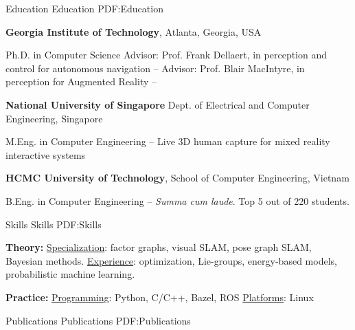 \documentclass[letterpaper,MMMyyyy,nonstopmode]{simpleresumecv}
\begin{document}
\begin{Body}

\Section
{Education}
{Education}
{PDF:Education}

\Entry
{\textbf{Georgia Institute of Technology}},
Atlanta, Georgia, USA

\Gap
\BulletItem
Ph.D. in Computer Science
\SubBulletItem
Advisor: Prof. Frank Dellaert, in perception and control for autonomous navigation
\hfill
{} -- 
\SubBulletItem
Advisor: Prof. Blair MacIntyre, in perception for Augmented Reality
\hfill
{} -- 

\BigGap
\Entry
{\textbf{National University of Singapore}}
Dept. of Electrical and Computer Engineering, Singapore

\Gap
\BulletItem
M.Eng. in Computer Engineering
\hfill
{} -- 
\SubBulletItem
Live 3D human capture for mixed reality interactive systems

\BigGap
\Entry
{\textbf{HCMC University of Technology}}, School of Computer Engineering, Vietnam

\Gap
\BulletItem
B.Eng. in Computer Engineering
\hfill
{} -- 
\SubBulletItem
\textit{Summa cum laude}. Top 5 out of 220 students.




\Section
{Skills}
{Skills}
{PDF:Skills}

\Entry
{\textbf{Theory:}}
\Gap
\BulletItem
\underline{Specialization}: factor graphs, visual SLAM, pose graph SLAM, Bayesian methods.
\BulletItem
\underline{Experience}: optimization, Lie-groups, energy-based models, probabilistic machine learning.

\BigGap
\Entry
{\textbf{Practice:}}
\Gap
\BulletItem
\underline{Programming}: Python, C/C++, Bazel, ROS
\BulletItem
\underline{Platforms}: Linux


\Section
{Publications}
{Publications}
{PDF:Publications}



\end{Body}
\end{document}
